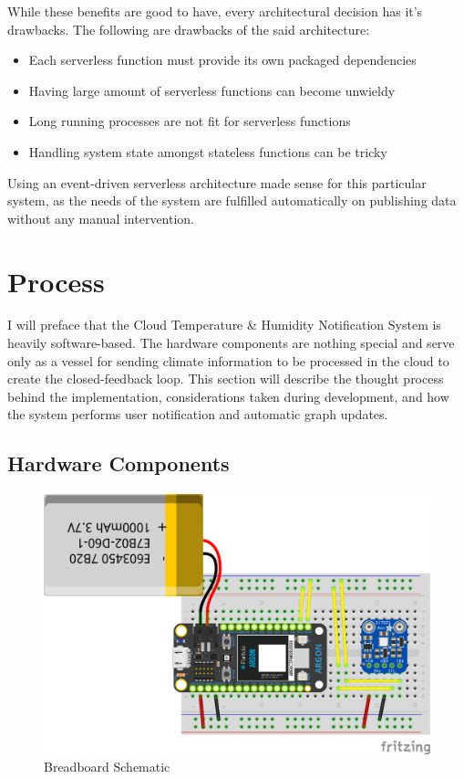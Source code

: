 \documentclass{article}
\begin{document}
While these benefits are good to have, every architectural decision has it's drawbacks. The following  are drawbacks of the said architecture:

\begin{itemize}
	\item Each serverless function must provide its own packaged dependencies
	\item Having large amount of serverless functions can become unwieldy
	\item Long running processes are not fit for serverless functions
	\item Handling system state amongst stateless functions can be tricky
\end{itemize}

Using an event-driven serverless architecture made sense for this particular system, as the needs of the system are fulfilled automatically on publishing data without any manual intervention.

\section{Process}
I will preface that the Cloud Temperature \& Humidity Notification System is heavily software-based. The hardware components are nothing special and serve only as a vessel for sending climate information to be processed in the cloud to create the closed-feedback loop. This section will describe the thought process behind the implementation, considerations taken during development, and how the system performs user notification and automatic graph updates.

\subsection{Hardware Components}
\begin{figure}[H]
	\center
	\includegraphics[width=\textwidth]{images/breadboard-schematic.png}
	\caption{Breadboard Schematic}
	\label{fig:breadboard_schematic}
\end{figure}
\end{document}
